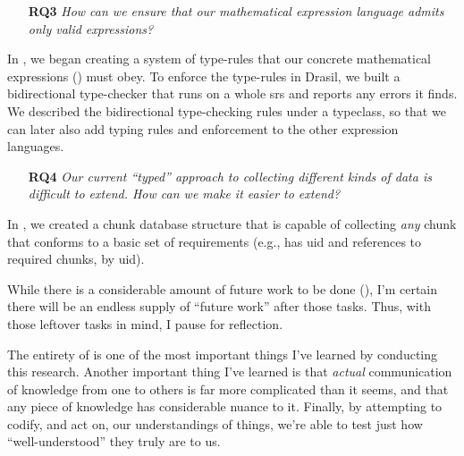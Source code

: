 \begin{enumerate}

    \item[\textbf{RQ3}] \textit{How can we ensure that our mathematical
          expression language admits only valid expressions?}

\end{enumerate}

In , we began creating a system of type-rules that our
concrete mathematical expressions (\Expr{}) must obey. To enforce the type-rules
in Drasil, we built a bidirectional type-checker that runs on a whole \acs{srs}
and reports any errors it finds. We described the bidirectional type-checking
rules under a typeclass, so that we can later also add typing rules and
enforcement to the other expression languages.

\begin{enumerate}

    \item[\textbf{RQ4}] \textit{Our current ``typed'' approach to collecting
          different kinds of data is difficult to extend. How can we make it
          easier to extend?}

\end{enumerate}

In , we created a chunk database structure that is
capable of collecting \textit{any} chunk that conforms to a basic set of
requirements (e.g., has \acs{uid} and references to required chunks, by
\acs{uid}).

While there is a considerable amount of future work to be done
(), I'm certain there will be an endless supply of
``future work'' after those tasks. Thus, with those leftover tasks in mind, I
pause for reflection.

The entirety of  is one of the most important things I've
learned by conducting this research. Another important thing I've learned is
that \textit{actual} communication of knowledge from one to others is far more
complicated than it seems, and that any piece of knowledge has considerable
nuance to it. Finally, by attempting to codify, and act on, our understandings
of things, we're able to test just how ``well-understood''
\cite{well-understood} they truly are to us.
